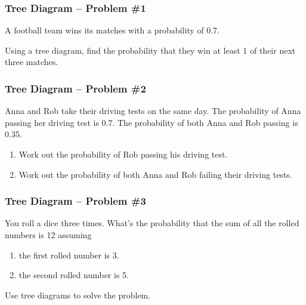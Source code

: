 \documentclass[aspectratio=169,11pt,usenames,dvipsnames,handout]{beamer}
\begin{document}
\begin{frame}
 \frametitle{Tree Diagram -- Problem \#1}
 A football team wins its matches with a probability of 0.7.

 Using a tree diagram, find the probability that they win at least 1 of their
 next three matches.
\end{frame}

\begin{frame}
 \frametitle{Tree Diagram -- Problem \#2}
 Anna and Rob take their driving tests on the same day. The probability of Anna
 passing her driving test is 0.7. The probability of both Anna and Rob passing
 is 0.35.

 \begin{enumerate}
  \item Work out the probability of Rob passing his driving test.
  \item Work out the probability of both Anna and Rob failing their driving
   tests.
 \end{enumerate}
\end{frame}

\begin{frame}
 \frametitle{Tree Diagram -- Problem \#3}
 You roll a dice three times. What's the probability that the sum of all the
 rolled numbers is 12 assuming
 \begin{enumerate}
  \item the first rolled number is 3.
  \item the second rolled number is 5.
 \end{enumerate}
 Use tree diagrams to solve the problem.
\end{frame}
%
%
%
\end{document}
